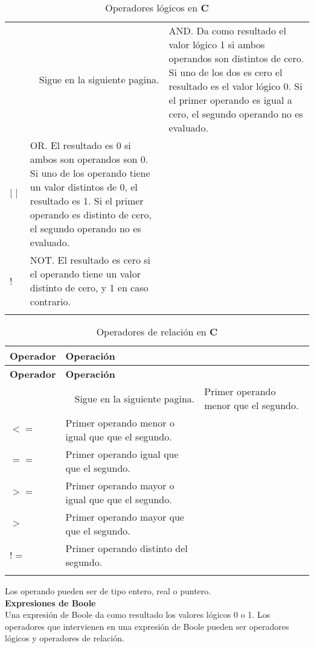 \documentclass[12pt, A4]{article}
\begin{document}
{{\begin{longtable}[h]{p{3cm} p{10cm}}
	\multicolumn{2}{r}{Sigue en la siguiente pagina.}
	\endfoot
	
	\endlastfoot
	\&\& & AND. Da como resultado el valor lógico 1 si ambos operandos son distintos de cero. Si uno de los dos es cero el resultado es el valor  lógico 0. Si el primer operando es igual a cero, el segundo operando no es evaluado.\\
	\rowcolor{gray!20}	$\mid\mid$ & OR. El resultado es 0 si ambos son operandos son 0. Si uno de los operando tiene un valor distintos de 0, el resultado es 1. Si el primer operando es distinto de cero, el segundo operando no es evaluado.\\
	! & NOT. El resultado es cero si el operando tiene un valor distinto de cero, y 1 en caso contrario.\\ \hline
	\caption{Operadores lógicos en \textbf{C}}
\end{longtable}			


\begin{longtable}[h]{p{3cm} p{10cm}}
	\centering
	\hline
	
	\textbf{Operador} & \textbf{Operación} \\
	\hline\hline
	\endfirsthead
	
	\hline
	\textbf{Operador} & \textbf{Operación} \\
	\hline\hline
	\endhead
	
	\multicolumn{2}{r}{Sigue en la siguiente pagina.}
	\endfoot
	
	\endlastfoot
	$<$ & Primer operando menor que el segundo. \\
	\rowcolor{gray!20}$<=$ & Primer operando menor o igual que que el segundo.\\
	$==$ & Primer operando  igual que que el segundo.\\
\rowcolor{gray!20}	$>=$ & Primer operando mayor o igual que que el segundo.\\
	$>$ & Primer operando mayor  que que el segundo.\\ 
\rowcolor{gray!20}	$!=$ & Primer operando  distinto del segundo.\\ \hline
	\caption{Operadores de relación en \textbf{C}}
\end{longtable}	
 Los operando pueden ser de tipo entero, real o puntero.\\
 \textbf{{{\Large } Expresiones de Boole  }}\\
 Una expresión de Boole da como resultado los valores lógicos 0 o 1. Los operadores que intervienen en una expresión de Boole pueden ser operadores lógicos y operadores de relación. 
 
}}
\end{document}
